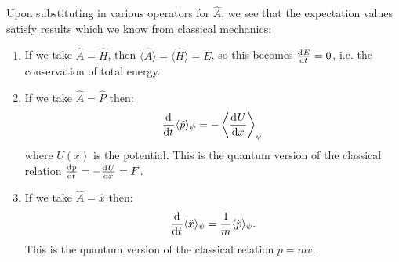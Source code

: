 \documentclass[../main.tex]{subfiles}
\begin{document}
\begin{example}
  Upon substituting in various operators for $\hat{A}$, we see that the expectation values satisfy results which we know from classical mechanics:
  \begin{enumerate}
    \item If we take $\hat{A} = \hat{H}$, then $\langle \hat{A} \rangle = \langle \hat{H} \rangle = E$, so this becomes $\deriv{E}{t} = 0$, i.e. the conservation of total energy.
    \item If we take $\hat{A} = \hat{P}$ then:
      \[
        \deriv{}{t}\langle \hat{p} \rangle_{\psi} = - \left\langle \deriv{U}{x} \right\rangle_{\psi} \\
      \]
      where $U(x)$ is the potential.
      This is the quantum version of the classical relation $\deriv{p}{t} = - \deriv{U}{x} = F$.
    \item If we take $\hat{A} = \hat{x}$ then:
      \[
        \deriv{}{t}\langle \hat{x} \rangle_{\psi} = \frac{1}{m} \langle \hat{p} \rangle_{\psi}.
      \]
      This is the quantum version of the classical relation $p = mv$.
  \end{enumerate}
\end{example}
\end{document}
